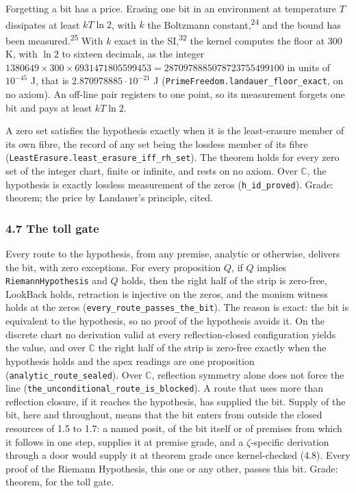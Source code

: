 \documentclass[10pt]{article}
\begin{document}
Forgetting a bit has a price. Erasing one bit in an environment at
temperature \(T\) dissipates at least \(kT \ln 2\), with \(k\) the
Boltzmann constant,\textsuperscript{24} and the bound has been
measured.\textsuperscript{25} With \(k\) exact in the
SI,\textsuperscript{32} the kernel computes the floor at 300 K, with
\(\ln 2\) to sixteen decimals, as the integer
\(1380649 \times 300 \times 6931471805599453 = 2870978885078723755499100\)
in units of \(10^{-45}\) J, that is \(2.870978885\cdot 10^{-21}\) J
(\texttt{PrimeFreedom.\allowbreak{}landauer\_\allowbreak{}floor\_\allowbreak{}exact},
on no axiom). An off-line pair registers to one point, so its
measurement forgets one bit and pays at least \(kT \ln 2\).

A zero set satisfies the hypothesis exactly when it is the least-erasure
member of its own fibre, the record of any set being the lossless member
of its fibre
(\texttt{LeastErasure.\allowbreak{}least\_\allowbreak{}erasure\_\allowbreak{}iff\_\allowbreak{}rh\_\allowbreak{}set}).
The theorem holds for every zero set of the integer chart, finite or
infinite, and rests on no axiom. Over \(\mathbb{C}\), the hypothesis is
exactly lossless measurement of the zeros
(\texttt{h\_\allowbreak{}id\_\allowbreak{}proved}). Grade: theorem; the
price by Landauer's principle, cited.

\hypertarget{the-toll-gate}{%
\subsubsection{4.7 The toll gate}\label{the-toll-gate}}

Every route to the hypothesis, from any premise, analytic or otherwise,
delivers the bit, with zero exceptions. For every proposition \(Q\), if
\(Q\) implies \texttt{RiemannHypothesis} and \(Q\) holds, then the right
half of the strip is zero-free, LookBack holds, retraction is injective
on the zeros, and the monism witness holds at the zeros
(\texttt{every\_\allowbreak{}route\_\allowbreak{}passes\_\allowbreak{}the\_\allowbreak{}bit}).
The reason is exact: the bit is equivalent to the hypothesis, so no
proof of the hypothesis avoids it. On the discrete chart no derivation
valid at every reflection-closed configuration yields the value, and
over \(\mathbb{C}\) the right half of the strip is zero-free exactly
when the hypothesis holds and the apex readings are one proposition
(\texttt{analytic\_\allowbreak{}route\_\allowbreak{}sealed}). Over
\(\mathbb{C}\), reflection symmetry alone does not force the line
(\texttt{the\_\allowbreak{}unconditional\_\allowbreak{}route\_\allowbreak{}is\_\allowbreak{}blocked}).
A route that uses more than reflection closure, if it reaches the
hypothesis, has supplied the bit. Supply of the bit, here and
throughout, means that the bit enters from outside the closed resources
of 1.5 to 1.7: a named posit, of the bit itself or of premises from
which it follows in one step, supplies it at premise grade, and a
\(\zeta\)-specific derivation through a door would supply it at theorem
grade once kernel-checked (4.8). Every proof of the Riemann Hypothesis,
this one or any other, passes this bit. Grade: theorem, for the toll
gate.
\end{document}
